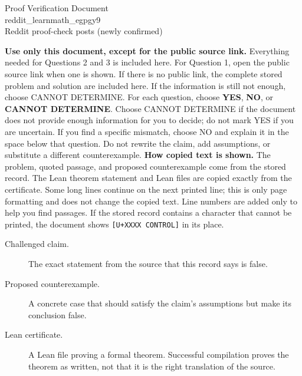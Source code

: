 \documentclass[11pt]{article}
\begin{document}
\begin{center}{\LARGE Proof Verification Document}\\[2pt]{\large reddit\_learnmath\_egpgy9}\\[2pt]{\small Reddit proof-check posts (newly confirmed)}\end{center}
\begin{center}\end{center}
\textbf{Use only this document, except for the public source link.} Everything needed for Questions 2 and 3 is included here. For Question 1, open the public source link when one is shown. If there is no public link, the complete stored problem and solution are included here. If the information is still not enough, choose CANNOT DETERMINE.
For each question, choose \textbf{YES}, \textbf{NO}, or \textbf{CANNOT DETERMINE}. Choose CANNOT DETERMINE if the document does not provide enough information for you to decide; do not mark YES if you are uncertain. If you find a specific mismatch, choose NO and explain it in the space below that question. Do not rewrite the claim, add assumptions, or substitute a different counterexample.
\textbf{How copied text is shown.} The problem, quoted passage, and proposed counterexample come from the stored record. The Lean theorem statement and Lean files are copied exactly from the certificate. Some long lines continue on the next printed line; this is only page formatting and does not change the copied text. Line numbers are added only to help you find passages. If the stored record contains a character that cannot be printed, the document shows \texttt{[U+XXXX CONTROL]} in its place.
\begin{description}
\item[Challenged claim.] The exact statement from the source that this record says is false.
\item[Proposed counterexample.] A concrete case that should satisfy the claim's assumptions but make its conclusion false.
\item[Lean certificate.] A Lean file proving a formal theorem. Successful compilation proves the theorem as written, not that it is the right translation of the source.
\end{description}
\end{document}
